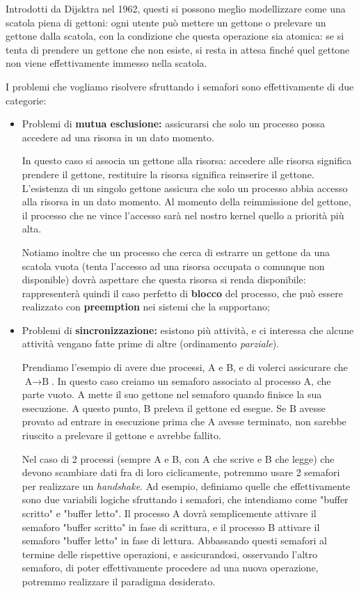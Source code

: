 \documentclass[a4paper,11pt]{article}
\begin{document}
Introdotti da Dijsktra nel 1962, questi si possono meglio modellizzare come una scatola piena di gettoni: ogni utente può mettere un gettone o prelevare un gettone dalla scatola, con la condizione che questa operazione sia atomica: se si tenta di prendere un gettone che non esiste, si resta in attesa finché quel gettone non viene effettivamente immesso nella scatola.

I problemi che vogliamo risolvere sfruttando i semafori sono effettivamente di due categorie:
\begin{itemize}
	\item Problemi di \textbf{mutua esclusione:} assicurarsi che solo un processo possa accedere ad una risorsa in un dato momento.

		In questo caso si associa un gettone alla risorsa: accedere alle risorsa significa prendere il gettone, restituire la risorsa significa reinserire il gettone. L'esistenza di un singolo gettone assicura che solo un processo abbia accesso alla risorsa in un dato momento.
		Al momento della reimmissione del gettone, il processo che ne vince l'accesso sarà nel nostro kernel quello a priorità più alta.

		Notiamo inoltre che un processo che cerca di estrarre un gettone da una scatola vuota (tenta l'accesso ad una risorsa occupata o comunque non disponible) dovrà aspettare che questa risorsa si renda disponibile: rappresenterà quindi il caso perfetto di \textbf{blocco} del processo, che può essere realizzato con \textbf{preemption} nei sistemi che la supportano;

	\item Problemi di \textbf{sincronizzazione:} esistono più attività, e ci interessa che alcune attività vengano fatte prime di altre (ordinamento \textit{parziale}).

		Prendiamo l'esempio di avere due processi, A e B, e di volerci assicurare che $\text{A} \rightarrow \text{B}$.
		In questo caso creiamo un semaforo associato al processo A, che parte vuoto. A mette il suo gettone nel semaforo quando finisce la sua esecuzione.
		A questo punto, B preleva il gettone ed esegue.
		Se B avesse provato ad entrare in esecuzione prima che A avesse terminato, non sarebbe riuscito a prelevare il gettone e avrebbe fallito.

		Nel caso di 2 processi (sempre A e B, con A che scrive e B che legge) che devono scambiare dati fra di loro ciclicamente, potremmo usare 2 semafori per realizzare un \textit{handshake}.
		Ad esempio, definiamo quelle che effettivamente sono due variabili logiche sfruttando i semafori, che intendiamo come "buffer scritto" e "buffer letto".
		Il processo A dovrà semplicemente attivare il semaforo "buffer scritto" in fase di scrittura, e il processo B attivare il semaforo "buffer letto" in fase di lettura.
		Abbassando questi semafori al termine delle rispettive operazioni, e assicurandosi, osservando l'altro semaforo, di poter effettivamente procedere ad una nuova operazione, potremmo realizzare il paradigma desiderato. 
\end{itemize}
\end{document}
